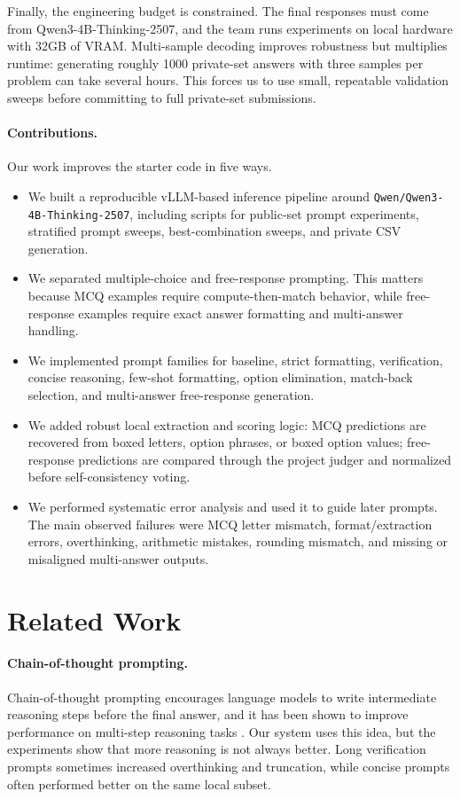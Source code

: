 \documentclass{article}
\newcommand{\model}{Qwen3-4B-Thinking-2507}
\newcommand{\modelhf}{\texttt{Qwen/Qwen3-4B-Thinking-2507}}
\begin{document}
Finally, the engineering budget is constrained. The final responses must come from \model, and the team runs experiments on local hardware with 32GB of VRAM. Multi-sample decoding improves robustness but multiplies runtime: generating roughly 1000 private-set answers with three samples per problem can take several hours. This forces us to use small, repeatable validation sweeps before committing to full private-set submissions.

\paragraph{Contributions.}
Our work improves the starter code in five ways.
\begin{itemize}
  \item We built a reproducible vLLM-based inference pipeline around \modelhf, including scripts for public-set prompt experiments, stratified prompt sweeps, best-combination sweeps, and private CSV generation.
  \item We separated multiple-choice and free-response prompting. This matters because MCQ examples require compute-then-match behavior, while free-response examples require exact answer formatting and multi-answer handling.
  \item We implemented prompt families for baseline, strict formatting, verification, concise reasoning, few-shot formatting, option elimination, match-back selection, and multi-answer free-response generation.
  \item We added robust local extraction and scoring logic: MCQ predictions are recovered from boxed letters, option phrases, or boxed option values; free-response predictions are compared through the project judger and normalized before self-consistency voting.
  \item We performed systematic error analysis and used it to guide later prompts. The main observed failures were MCQ letter mismatch, format/extraction errors, overthinking, arithmetic mistakes, rounding mismatch, and missing or misaligned multi-answer outputs.
\end{itemize}

\section{Related Work}
\label{sec:relatedwork}

\paragraph{Chain-of-thought prompting.}
Chain-of-thought prompting encourages language models to write intermediate reasoning steps before the final answer, and it has been shown to improve performance on multi-step reasoning tasks \citep{wei2022chain}. Our system uses this idea, but the experiments show that more reasoning is not always better. Long verification prompts sometimes increased overthinking and truncation, while concise prompts often performed better on the same local subset.
\end{document}
